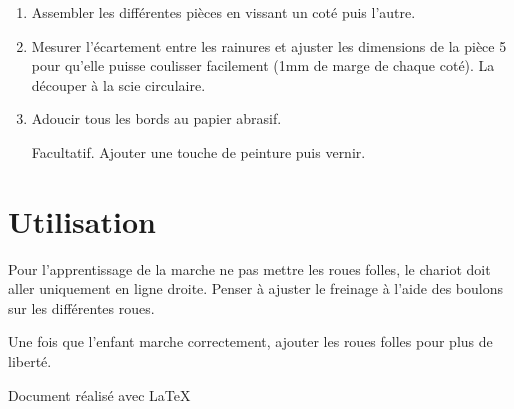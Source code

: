 \documentclass[a4paper,oneside]{article}
\begin{document}
\begin{enumerate}
\begin{figure}[!h]
{\begin{tikzpicture}[scale=0.5]
  \end{tikzpicture}
  }
\end{figure}

\item Assembler les différentes pièces en vissant un coté puis l'autre.
\item Mesurer l'écartement entre les rainures et ajuster les dimensions de la pièce 5 pour qu'elle puisse coulisser facilement (1mm de marge de chaque coté).
La découper à la scie circulaire.
\item Adoucir tous les bords au papier abrasif.
\item[Facultatif.] Ajouter une touche de peinture puis vernir.
\end{enumerate}

\section{Utilisation}

Pour l'apprentissage de la marche ne pas mettre les roues folles, le chariot doit aller uniquement en ligne droite.
Penser à ajuster le freinage à l'aide des boulons sur les différentes roues.

Une fois que l'enfant marche correctement, ajouter les roues folles pour plus de liberté.


\vfill
\hfill \small Document réalisé avec \LaTeX
\end{document}
